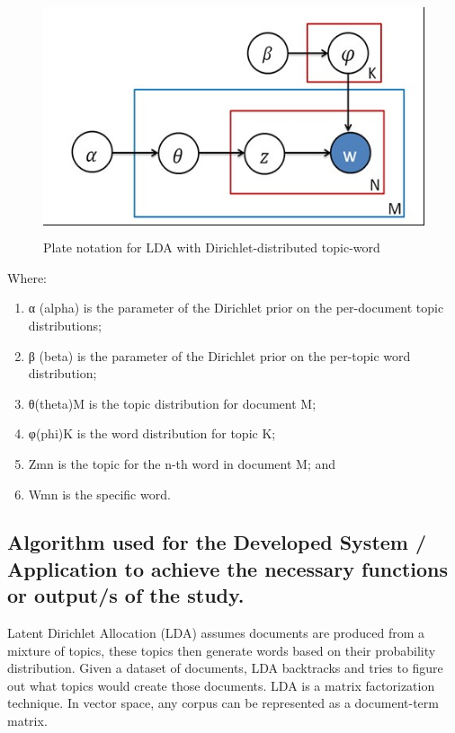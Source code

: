     \begin{figure}[H]
	\centering
	\includegraphics[width=12cm,height=7cm]{image/cs_figure6.jpg}
	\caption{Plate notation for LDA with Dirichlet-distributed topic-word}
	\end{figure}

\noindent Where:
\vspace{-2ex}
\begin{enumerate}
	\item [] α (alpha) is the parameter of the Dirichlet prior on the per-document topic distributions;
	\item [] β (beta) is the parameter of the Dirichlet prior on the per-topic word distribution;
	\item [] θ(theta)M  is the topic distribution for document M;
	\item [] φ(phi)K is the word distribution for topic K;
	\item [] Zmn is the topic for the n-th word in document M; and
	\item [] Wmn is the specific word.
\end{enumerate}

\subsection{Algorithm used for the Developed System / Application to achieve the necessary functions or output/s of the study.}

Latent Dirichlet Allocation (LDA) assumes documents are produced from a mixture of topics, these topics then generate words based on their probability distribution. Given a dataset of documents, LDA backtracks and tries to figure out what topics would create those documents. LDA is a matrix factorization technique. In vector space, any corpus can be represented as a document-term matrix.

